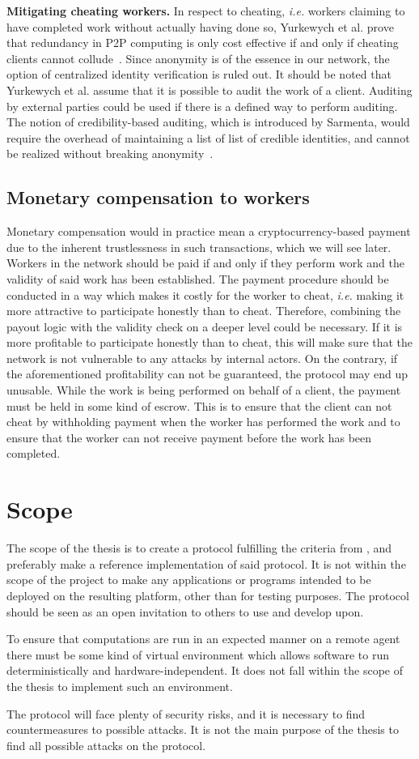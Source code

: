 \textbf{Mitigating cheating workers.}
In respect to cheating, \textit{i.e.} workers claiming to have completed work without actually having done so, Yurkewych et al. prove that redundancy in P2P computing is only cost effective if and only if cheating clients cannot collude~\cite{yurkewych:2005}. Since anonymity is of the essence in our network, the option of centralized identity verification is ruled out. It should be noted that Yurkewych et al. assume that it is possible to audit the work of a client. Auditing by external parties could be used if there is a defined way to perform auditing. The notion of credibility-based auditing, which is introduced by Sarmenta, would require the overhead of maintaining a list of list of credible identities, and cannot be realized without breaking anonymity~\cite{sarmenta:2002}.

\subsection{Monetary compensation to workers}
Monetary compensation would in practice mean a cryptocurrency-based payment due to the inherent trustlessness in such transactions, which we will see later. Workers in the network should be paid if and only if they perform work and the validity of said work has been established. The payment procedure should be conducted in a way which makes it costly for the worker to cheat, \textit{i.e.} making it more attractive to participate honestly than to cheat. Therefore, combining the payout logic with the validity check on a deeper level could be necessary. If it is more profitable to participate honestly than to cheat, this will make sure that the network is not vulnerable to any attacks by internal actors. On the contrary, if the aforementioned profitability can not be guaranteed, the protocol may end up unusable. While the work is being performed on behalf of a client, the payment must be held in some kind of escrow. This is to ensure that the client can not cheat by withholding payment when the worker has performed the work and to ensure that the worker can not receive payment before the work has been completed.

\section{Scope}
The scope of the thesis is to create a protocol fulfilling the criteria from , and preferably make a reference implementation of said protocol. It is not within the scope of the project to make any applications or programs intended to be deployed on the resulting platform, other than for testing purposes. The protocol should be seen as an open invitation to others to use and develop upon.

To ensure that computations are run in an expected manner on a remote agent there must be some kind of virtual environment which allows software to run deterministically and hardware-independent. It does not fall within the scope of the thesis to implement such an environment.

The protocol will face plenty of security risks, and it is necessary to find countermeasures to possible attacks. It is not the main purpose of the thesis to find all possible attacks on the protocol.